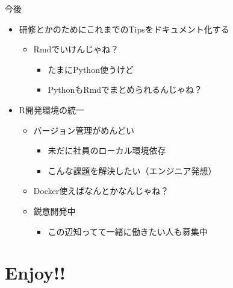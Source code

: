 \documentclass[ignorenonframetext,]{beamer}
\providecommand{\tightlist}{%
  \setlength{\itemsep}{0pt}\setlength{\parskip}{0pt}}
\begin{document}
\begin{frame}{今後}

\begin{itemize}
\tightlist
\item
  研修とかのためにこれまでのTipsをドキュメント化する

  \begin{itemize}
  \tightlist
  \item
    Rmdでいけんじゃね？

    \begin{itemize}
    \tightlist
    \item
      たまにPython使うけど
    \item
      PythonもRmdでまとめられるんじゃね？
    \end{itemize}
  \end{itemize}
\item
  R開発環境の統一

  \begin{itemize}
  \tightlist
  \item
    バージョン管理がめんどい

    \begin{itemize}
    \tightlist
    \item
      未だに社員のローカル環境依存
    \item
      こんな課題を解決したい（エンジニア発想）
    \end{itemize}
  \item
    Docker使えばなんとかなんじゃね？
  \item
    鋭意開発中

    \begin{itemize}
    \tightlist
    \item
      この辺知ってて一緒に働きたい人も募集中
    \end{itemize}
  \end{itemize}
\end{itemize}

\end{frame}

\hypertarget{enjoy}{%
\section{Enjoy!!}\label{enjoy}}
\end{document}
